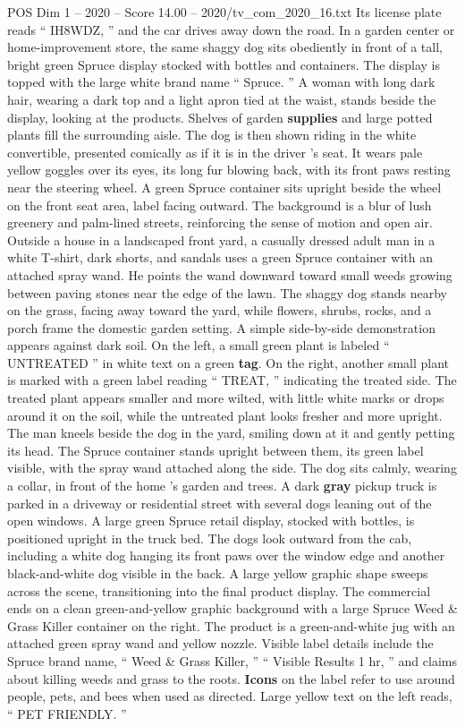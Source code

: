 \begin{textsample}{POS Dim 1 – 2020 – Score 14.00 – 2020/tv\_com\_2020\_16.txt}
Its license plate reads “ IH8WDZ, ” and the car drives away down the road.
In a garden center or home-improvement store, the same shaggy dog sits obediently in front of a tall, bright green Spruce display stocked with bottles and containers.
The display is topped with the large white brand name “ Spruce. ” A woman with long dark hair, wearing a dark top and a light apron tied at the waist, stands beside the display, looking at the products.
Shelves of garden \textbf{supplies} and large potted plants fill the surrounding aisle.
The dog is then shown riding in the white convertible, presented comically as if it is in the driver ’s seat.
It wears pale yellow goggles over its eyes, its long fur blowing back, with its front paws resting near the steering wheel.
A green Spruce container sits upright beside the wheel on the front seat area, label facing outward.
The background is a blur of lush greenery and palm-lined streets, reinforcing the sense of motion and open air.
Outside a house in a landscaped front yard, a casually dressed adult man in a white T-shirt, dark shorts, and sandals uses a green Spruce container with an attached spray wand.
He points the wand downward toward small weeds growing between paving stones near the edge of the lawn.
The shaggy dog stands nearby on the grass, facing away toward the yard, while flowers, shrubs, rocks, and a porch frame the domestic garden setting.
A simple side-by-side demonstration appears against dark soil.
On the left, a small green plant is labeled “ UNTREATED ” in white text on a green \textbf{tag}.
On the right, another small plant is marked with a green label reading “ TREAT, ” indicating the treated side.
The treated plant appears smaller and more wilted, with little white marks or drops around it on the soil, while the untreated plant looks fresher and more upright.
The man kneels beside the dog in the yard, smiling down at it and gently petting its head.
The Spruce container stands upright between them, its green label visible, with the spray wand attached along the side.
The dog sits calmly, wearing a collar, in front of the home ’s garden and trees.
A dark \textbf{gray} pickup truck is parked in a driveway or residential street with several dogs leaning out of the open windows.
A large green Spruce retail display, stocked with bottles, is positioned upright in the truck bed.
The dogs look outward from the cab, including a white dog hanging its front paws over the window edge and another black-and-white dog visible in the back.
A large yellow graphic shape sweeps across the scene, transitioning into the final product display.
The commercial ends on a clean green-and-yellow graphic background with a large Spruce Weed \& Grass Killer container on the right.
The product is a green-and-white jug with an attached green spray wand and yellow nozzle.
Visible label details include the Spruce brand name, “ Weed \& Grass Killer, ” “ Visible Results 1 hr, ” and claims about killing weeds and grass to the roots. \textbf{Icons} on the label refer to use around people, pets, and bees when used as directed.
Large yellow text on the left reads, “ PET FRIENDLY. ”

\end{textsample}
